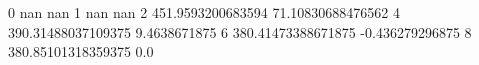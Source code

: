 0 nan nan
1 nan nan
2 451.9593200683594 71.10830688476562
4 390.31488037109375 9.4638671875
6 380.41473388671875 -0.436279296875
8 380.85101318359375 0.0

